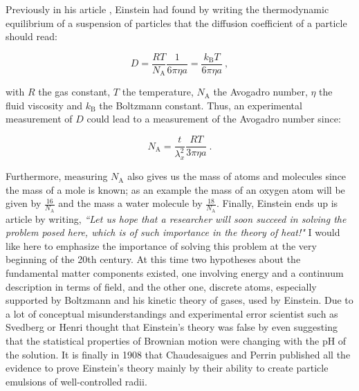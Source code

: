 Previously in his article \cite{einstein_uber_1905}, Einstein had found by writing the thermodynamic equilibrium of a suspension of particles that the diffusion coefficient of a particle should read:

\begin{equation}
	D = \frac{R T}{N_\mathrm{A}}\frac{1}{6\pi \eta a} = \frac{k_\mathrm{B}T}{6 \pi \eta a}
	~,
	\label{Eq:D_einstein}
\end{equation}


with $R$ the gas constant, $T$ the temperature, $N_\mathrm{A}$ the Avogadro number, $\eta$ the fluid viscosity and $k_\mathrm{B}$ the Boltzmann constant. Thus, an experimental measurement of $D$ could lead to a measurement of the Avogadro number since:

\begin{equation}
	N_\mathrm{A} = \frac{t}{\lambda_x^2} \frac{RT}{3\pi \eta a} ~.
\end{equation}

Furthermore, measuring $N_\mathrm{A}$ also gives us the mass of atoms and molecules since the mass of a mole is known; as an example the mass of an oxygen atom will be given by $\frac{16}{N_\mathrm{A}}$ and the mass a water molecule by $\frac{18}{N_\mathrm{A}}$. Finally, Einstein ends up is article \cite{einstein_uber_1905} by writing, \textit{``Let us hope that a researcher will soon succeed in solving the problem posed here, which is of such importance in the theory of heat!"} I would like here to emphasize the importance of solving this problem at the very beginning of the 20th century. At this time two hypotheses about the fundamental matter components existed, one involving energy and a continuum description in terms of field, and the other one, discrete atoms, especially supported by Boltzmann and his kinetic theory of gases, used by Einstein. Due to a lot of conceptual misunderstandings and experimental error scientist such as Svedberg or Henri thought that Einstein's theory was false \cite{genthon_concept_2020} by even suggesting that the statistical properties of Brownian motion were changing with the pH of the solution. It is finally in 1908 that Chaudesaigues and Perrin published all the evidence to prove Einstein's theory mainly by their ability to create particle emulsions of well-controlled radii. 

